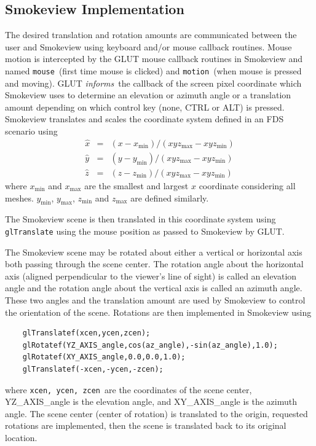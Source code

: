 \documentclass[11pt,twoside]{book}
\begin{document}
\subsection{Smokeview Implementation}
The desired translation and rotation amounts are communicated
between the user and Smokeview using keyboard and/or mouse
callback routines.  Mouse motion is intercepted by the GLUT
mouse callback routines in Smokeview and named {\tt mouse}\ (first time mouse is clicked) and {\tt motion}\
(when mouse is pressed and moving).  GLUT {\em informs}\ the callback of the screen pixel coordinate which Smokeview uses to determine an elevation or azimuth angle or a translation amount depending on which control key (none, CTRL or ALT) is pressed.
Smokeview translates and scales the coordinate system defined in an FDS
scenario using
\newcommand{\mmin}{\mbox{min}}
\newcommand{\mmax}{\mbox{max}}
\begin{eqnarray*}
\hat{x}&=&(x-x_{\min})/(xyz_{\max}-xyz_{\min})\\
\hat{y}&=&(y-y_{\min})/(xyz_{\max}-xyz_{\min})\\
\hat{z}&=&(z-z_{\min})/(xyz_{\max}-xyz_{\min})
\end{eqnarray*}
where $x_{\min}$ and $x_{\max}$ are the smallest and largest $x$ coordinate considering all meshes.  $y_{\min}$, $y_{\max}$, $z_{\min}$ and $z_{\max}$ are defined similarly.

The Smokeview scene is then translated in this coordinate system using {\tt glTranslate}
using the mouse position as passed to Smokeview by GLUT.

The Smokeview scene may be rotated about either a vertical or horizontal axis both passing through the scene center.  The rotation angle about the horizontal axis (aligned perpendicular to the viewer's line of sight) is called an elevation angle and the rotation angle about the vertical axis is called an azimuth angle.
These two angles and the translation amount are used by Smokeview to control the orientation of the scene.   Rotations are then implemented in Smokeview using
\begin{verbatim}
    glTranslatef(xcen,ycen,zcen);
    glRotatef(YZ_AXIS_angle,cos(az_angle),-sin(az_angle),1.0);
    glRotatef(XY_AXIS_angle,0.0,0.0,1.0);
    glTranslatef(-xcen,-ycen,-zcen);
\end{verbatim}
where {\tt xcen, ycen, zcen}\ are the coordinates of the scene center, YZ\_AXIS\_angle is the elevation angle, and XY\_AXIS\_angle is the azimuth angle.  The scene center (center of rotation) is translated to the origin, requested rotations are implemented, then the scene is translated back to its original location.
\end{document}
